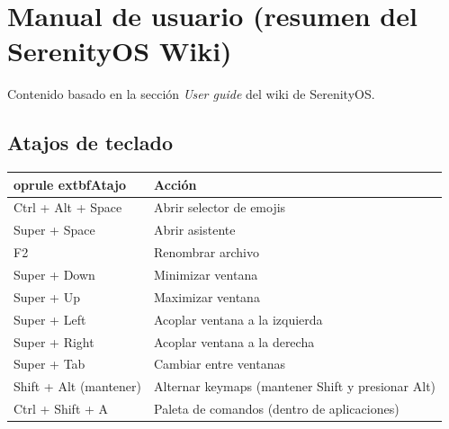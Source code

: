 \section{Manual de usuario (resumen del SerenityOS Wiki)}

Contenido basado en la sección \emph{User guide} del wiki de SerenityOS.

\subsection{Atajos de teclado}
\begin{center}
\begin{tabular}{ll}
	oprule
	extbf{Atajo} & \textbf{Acción} \\
\midrule
{\ttfamily Ctrl + Alt + Space} & Abrir selector de emojis \\
{\ttfamily Super + Space} & Abrir asistente \\
{\ttfamily F2} & Renombrar archivo \\
{\ttfamily Super + Down} & Minimizar ventana \\
{\ttfamily Super + Up} & Maximizar ventana \\
{\ttfamily Super + Left} & Acoplar ventana a la izquierda \\
{\ttfamily Super + Right} & Acoplar ventana a la derecha \\
{\ttfamily Super + Tab} & Cambiar entre ventanas \\
{\ttfamily Shift + Alt (mantener)} & Alternar keymaps (mantener Shift y presionar Alt) \\
{\ttfamily Ctrl + Shift + A} & Paleta de comandos (dentro de aplicaciones) \\
\bottomrule
\end{tabular}
\end{center}

